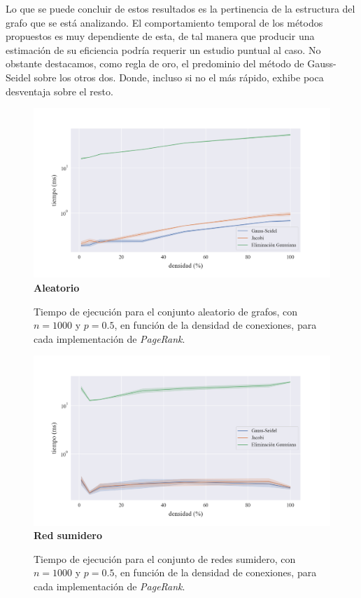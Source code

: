 Lo que se puede concluir de estos resultados es la pertinencia de la estructura del grafo que se está analizando.
El comportamiento temporal de los métodos propuestos es muy dependiente de esta, de tal manera que
producir una estimación de su eficiencia podría requerir un estudio puntual al caso.
No obstante destacamos, como regla de oro, el predominio del método de Gauss-Seidel sobre los otros dos.
Donde, incluso si no el más rápido, exhibe poca desventaja sobre el resto.

\begin{figure}[!htbp]
    \centering
    \includegraphics[width=1\textwidth, trim=0 0 0 30]{files/src/.media/densidad_aleatorio.png}
    \textbf{Aleatorio}\par
    \caption{Tiempo de ejecución para el conjunto aleatorio de grafos, con $n = 1000$ y $p = 0.5$, en función de la densidad de conexiones, para cada implementación de \textit{PageRank}.}
    \label{densidad_aleatorio}
\end{figure}

\begin{figure}[!htbp]
    \centering
    \includegraphics[width=1\textwidth, trim=0 0 0 30]{files/src/.media/densidad_red_sumidero.png}
    \textbf{Red sumidero}\par
    \caption{Tiempo de ejecución para el conjunto de redes sumidero, con $n = 1000$ y $p = 0.5$, en función de la densidad de conexiones, para cada implementación de \textit{PageRank}.}
    \label{densidad_red_sumidero}
\end{figure}

